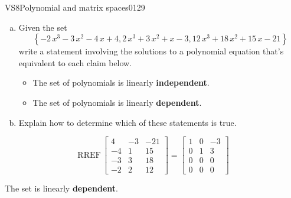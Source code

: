 \begin{exercise}{VS8}{Polynomial and matrix spaces}{0129} 
\begin{exerciseStatement} 

\begin{enumerate}[(a)]
\item  

 Given the set \[\left\{ -2 \, x^{3} - 3 \, x^{2} - 4 \, x + 4 , 2 \, x^{3} + 3 \, x^{2} + x - 3 , 12 \, x^{3} + 18 \, x^{2} + 15 \, x - 21 \right\}\] write a statement involving the solutions to a polynomial equation that's equivalent to each claim below. 

 

\begin{itemize}
\item  

 The set of polynomials is linearly \textbf{independent}. 

 
\item  

 The set of polynomials is linearly \textbf{dependent}. 

 
\end{itemize}

     
\item  

 Explain how to determine which of these statements is true. 

 
\end{enumerate}

     \end{exerciseStatement}
 \begin{exerciseAnswer} 

 \[
\mathrm{RREF}\, \left[\begin{array}{ccc}
4 & -3 & -21 \\
-4 & 1 & 15 \\
-3 & 3 & 18 \\
-2 & 2 & 12
\end{array}\right] = \left[\begin{array}{ccc}
1 & 0 & -3 \\
0 & 1 & 3 \\
0 & 0 & 0 \\
0 & 0 & 0
\end{array}\right]
            \] 

 

 The set is linearly \textbf{dependent}. 

 \end{exerciseAnswer}
 \end{exercise}


